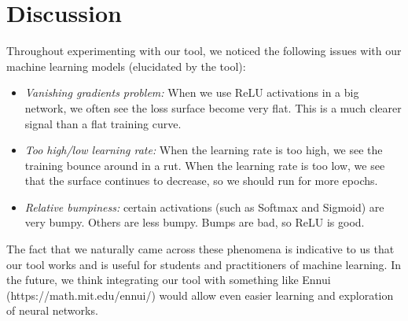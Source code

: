 \documentclass[letterpaper]{article}
\begin{document}
\section{Discussion}

Throughout experimenting with our tool, we noticed the following issues with our machine learning models (elucidated by the tool):

\begin{itemize}
    \item \textit{Vanishing gradients problem:} When we use ReLU activations in a big network, we often see the loss surface become very flat.  This is a much clearer signal than a flat training curve.
    \item \textit{Too high/low learning rate:} When the learning rate is too high, we see the training bounce around in a rut.  When the learning rate is too low, we see that the surface continues to decrease, so we should run for more epochs.
    \item \textit{Relative bumpiness:} certain activations (such as Softmax and Sigmoid) are very bumpy.  Others are less bumpy.  Bumps are bad, so ReLU is good.
\end{itemize}

The fact that we naturally came across these phenomena is indicative to us that our tool works and is useful for students and practitioners of machine learning.  In the future, we think integrating our tool with something like Ennui (https://math.mit.edu/ennui/) would allow even easier learning and exploration of neural networks.

{}

\end{document}
